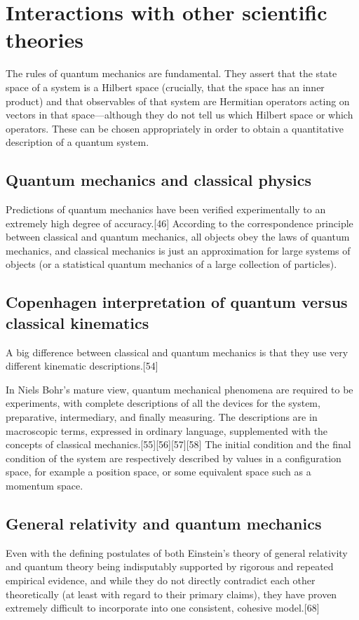 \documentclass{article}
\begin{document}
\section{Interactions with other scientific theories}
The rules of quantum mechanics are fundamental. They assert that the state space of a system is a Hilbert space (crucially, that the space has an inner product) and that observables of that system are Hermitian operators acting on vectors in that space—although they do not tell us which Hilbert space or which operators. These can be chosen appropriately in order to obtain a quantitative description of a quantum system.
\subsection{Quantum mechanics and classical physics}

Predictions of quantum mechanics have been verified experimentally to an extremely high degree of accuracy.[46] According to the correspondence principle between classical and quantum mechanics, all objects obey the laws of quantum mechanics, and classical mechanics is just an approximation for large systems of objects (or a statistical quantum mechanics of a large collection of particles).
\subsection{Copenhagen interpretation of quantum versus classical kinematics}
A big difference between classical and quantum mechanics is that they use very different kinematic descriptions.[54]

In Niels Bohr's mature view, quantum mechanical phenomena are required to be experiments, with complete descriptions of all the devices for the system, preparative, intermediary, and finally measuring. The descriptions are in macroscopic terms, expressed in ordinary language, supplemented with the concepts of classical mechanics.[55][56][57][58] The initial condition and the final condition of the system are respectively described by values in a configuration space, for example a position space, or some equivalent space such as a momentum space. 

\subsection{General relativity and quantum mechanics}
Even with the defining postulates of both Einstein's theory of general relativity and quantum theory being indisputably supported by rigorous and repeated empirical evidence, and while they do not directly contradict each other theoretically (at least with regard to their primary claims), they have proven extremely difficult to incorporate into one consistent, cohesive model.[68]
\end{document}
